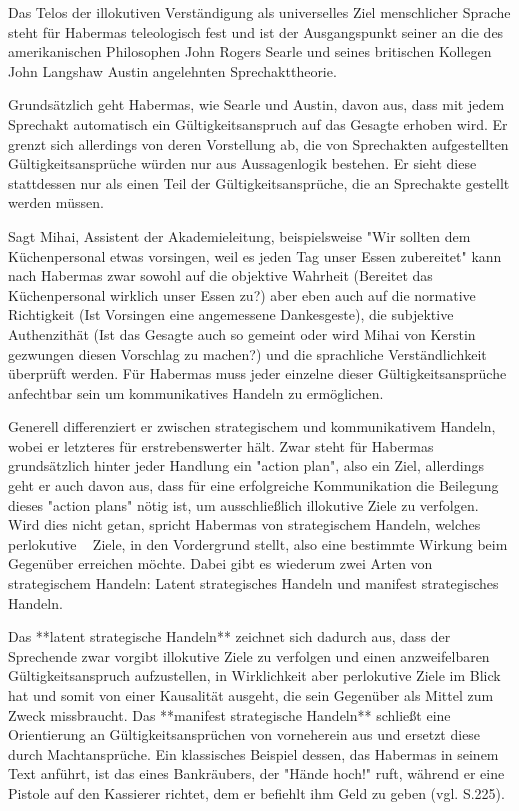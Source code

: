 Das Telos der illokutiven Verständigung als universelles Ziel menschlicher Sprache steht für Habermas teleologisch fest und ist der Ausgangspunkt seiner an die des amerikanischen Philosophen John Rogers Searle und seines britischen Kollegen John Langshaw Austin angelehnten Sprechakttheorie.

Grundsätzlich geht Habermas, wie Searle und Austin, davon aus, dass mit jedem Sprechakt automatisch ein Gültigkeitsanspruch auf das Gesagte erhoben wird.
Er grenzt sich allerdings von deren Vorstellung ab, die von Sprechakten aufgestellten Gültigkeitsansprüche würden nur aus Aussagenlogik bestehen.
Er sieht diese stattdessen nur als einen Teil der Gültigkeitsansprüche, die an Sprechakte gestellt werden müssen.

Sagt Mihai, Assistent der Akademieleitung, beispielsweise "Wir sollten dem Küchenpersonal etwas vorsingen, weil es jeden Tag unser Essen zubereitet" kann nach Habermas zwar sowohl auf die objektive Wahrheit (Bereitet das Küchenpersonal wirklich unser Essen zu?) aber eben auch auf die normative Richtigkeit (Ist Vorsingen eine angemessene Dankesgeste), die subjektive Authenzithät (Ist das Gesagte auch so gemeint oder wird Mihai von Kerstin gezwungen diesen Vorschlag zu machen?) und die sprachliche Verständlichkeit überprüft werden.
Für Habermas muss jeder einzelne dieser Gültigkeitsansprüche anfechtbar sein um kommunikatives Handeln zu ermöglichen.

Generell differenziert er zwischen strategischem und kommunikativem Handeln, wobei er letzteres für erstrebenswerter hält.
Zwar steht für Habermas grundsätzlich hinter jeder Handlung ein "action plan", also ein Ziel, allerdings geht er auch davon aus, dass für eine erfolgreiche Kommunikation die Beilegung dieses "action plans" nötig ist, um ausschließlich illokutive Ziele zu verfolgen.
Wird dies nicht getan, spricht Habermas von strategischem Handeln, welches perlokutive ~ Ziele, in den Vordergrund stellt, also eine bestimmte Wirkung beim Gegenüber erreichen möchte.
Dabei gibt es wiederum zwei Arten von strategischem Handeln:
Latent strategisches Handeln und manifest strategisches Handeln.

Das **latent strategische Handeln** zeichnet sich dadurch aus, dass der Sprechende zwar vorgibt illokutive Ziele zu verfolgen und einen anzweifelbaren Gültigkeitsanspruch aufzustellen, in Wirklichkeit aber perlokutive Ziele im Blick hat und somit von einer Kausalität ausgeht, die sein Gegenüber als Mittel zum Zweck missbraucht.
Das **manifest strategische Handeln** schließt eine Orientierung an Gültigkeitsansprüchen von vorneherein aus und ersetzt diese durch Machtansprüche. Ein klassisches Beispiel dessen, das Habermas in seinem Text anführt, ist das eines Bankräubers, der "Hände hoch!" ruft, während er eine Pistole auf den Kassierer richtet, dem er befiehlt ihm Geld zu geben (vgl. S.225).

